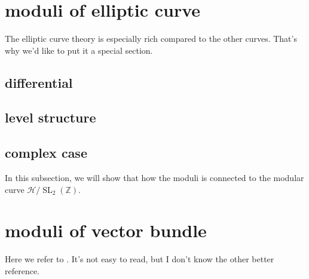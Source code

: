 \documentclass[reqno,11pt]{amsart}
\numberwithin{equation}{section}
\theoremstyle{plain}
\theoremstyle{plain}
\numberwithin{equation}{section}
\theoremstyle{remark}
\DeclareMathOperator{\SL}{\operatorname{SL}}
\begin{document}
\section{moduli of elliptic curve}
The elliptic curve theory is especially rich compared to the other curves. That's why we'd like to put it a special section.
\subsection{differential}
\subsection{level structure}
\subsection{complex case}
In this subsection, we will show that how the moduli is connected to the modular curve $\mathcal{H}/\SL_2(\mathbb{Z})$.

\section{moduli of vector bundle}
Here we refer to \cite{huybrechts2010geometry}. It's not easy to read, but I don't know the other better reference.


\end{document}
